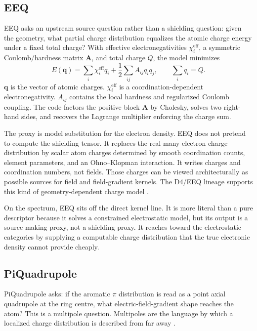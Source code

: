 \documentclass[11pt]{article}
\begin{document}
\subsection{EEQ}

EEQ asks an upstream source question rather than a shielding question: given the
geometry, what partial charge distribution equalizes the atomic charge energy
under a fixed total charge? With effective electronegativities
\(\chi_i^{\mathrm{eff}}\), a symmetric Coulomb/hardness matrix \(\bm A\), and
total charge \(Q\), the model minimizes
\[
  E(\bm q)=
  \sum_i\chi_i^{\mathrm{eff}}q_i
  +\frac12\sum_{ij}A_{ij}q_iq_j,
  \qquad
  \sum_i q_i=Q .
\]
\(\bm q\) is the vector of atomic charges. \(\chi_i^{\mathrm{eff}}\) is a
coordination-dependent electronegativity. \(A_{ij}\) contains the local
hardness and regularized Coulomb coupling. The code factors the positive block
\(\bm A\) by Cholesky, solves two right-hand sides, and recovers the
Lagrange multiplier enforcing the charge sum.

The proxy is model substitution for the electron density. EEQ does not pretend
to compute the shielding tensor. It replaces the real many-electron charge
distribution by scalar atom charges determined by smooth coordination counts,
element parameters, and an Ohno--Klopman interaction. It writes charges and
coordination numbers, not fields. Those charges can be viewed architecturally
as possible sources for field and field-gradient kernels. The D4/EEQ lineage
supports this kind of geometry-dependent charge model
\cite{nistor2006,caldeweyher2019}.

On the spectrum, EEQ sits off the direct kernel line. It is more literal than a
pure descriptor because it solves a constrained electrostatic model, but its
output is a source-making proxy, not a shielding proxy. It reaches toward the
electrostatic categories by supplying a computable charge distribution that the
true electronic density cannot provide cheaply.

\subsection{PiQuadrupole}

PiQuadrupole asks: if the aromatic \(\pi\) distribution is read as a point
axial quadrupole at the ring centre, what electric-field-gradient shape reaches
the atom? This is a multipole question. Multipoles are the language by which a
localized charge distribution is described from far away \cite{stone2005}.
\end{document}
